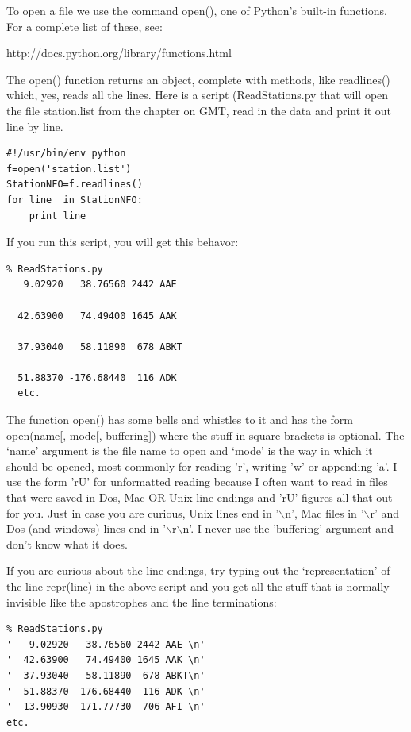 \documentclass[11pt]{book}
\begin{document}
{To open a file we use the command {\color{blue}open()}, one of Python's built-in functions.  For a complete list of these, see:

http://docs.python.org/library/functions.html

\noindent  The  {\color{blue}open()} function returns an object,  complete with methods, like {\color{blue}readlines()} which, yes, reads all the lines.  
Here is a script ({\color{blue}ReadStations.py} that will open the file  {\color{blue}station.list} from the chapter on GMT, read in the data and print it out line by line.  
{ \color{blue} \begin{verbatim}
#!/usr/bin/env python
f=open('station.list')
StationNFO=f.readlines()
for line  in StationNFO:
    print line
\end{verbatim}}

If you run this script, you will get this behavor:
{ \color{blue} \begin{verbatim}
% ReadStations.py
   9.02920   38.76560 2442 AAE 

  42.63900   74.49400 1645 AAK 

  37.93040   58.11890  678 ABKT

  51.88370 -176.68440  116 ADK 
  etc.
  \end{verbatim}}

\noindent The function  {\color{blue}open()} has some bells and whistles to it and has the form  {\color{blue}open(name[, mode[, buffering])} where the stuff in square brackets is optional.  The `name' argument is the file name to open and `mode' is the way in which it should be opened, most commonly for reading 'r', writing 'w' or appending 'a'.  I use the form 'rU' for unformatted reading because I often want to read in files that were saved in Dos, Mac OR Unix line endings and 'rU' figures all that out for you.  Just in case you are curious, Unix lines end in '$\backslash$n',  Mac files in '$\backslash$r' and Dos (and windows) lines end in '$\backslash$r$\backslash$n'.     I never use the 'buffering' argument and don't know what it does.  

If you are curious about the line endings, try typing out the `representation' of the line {\color{blue}repr(line)} in the above script and you get all the  stuff that is normally  invisible like the apostrophes and the line terminations:

{ \color{blue} \begin{verbatim}
% ReadStations.py
'   9.02920   38.76560 2442 AAE \n'
'  42.63900   74.49400 1645 AAK \n'
'  37.93040   58.11890  678 ABKT\n'
'  51.88370 -176.68440  116 ADK \n'
' -13.90930 -171.77730  706 AFI \n'
etc.
\end{verbatim}}

}
\end{document}
